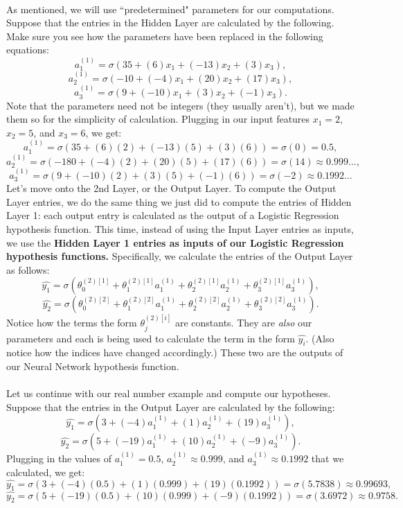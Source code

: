 \documentclass{article}
\begin{document}
\\
As mentioned, we will use ``predetermined" parameters for our computations. Suppose that the entries in the Hidden Layer are calculated by the following. Make sure you see how the parameters have been replaced in the following equations:
\[a_1^{(1)}=\sigma(35+(6)x_1+(-13)x_2+(3)x_3),\]
\[a_2^{(1)}=\sigma(-10+(-4)x_1+(20)x_2+(17)x_3),\]
\[a_3^{(1)}=\sigma(9+(-10)x_1+(3)x_2+(-1)x_3).\]
Note that the parameters need not be integers (they usually aren't), but we made them so for the simplicity of calculation. Plugging in our input features $x_1=2$, $x_2=5$, and $x_3=6$, we get:
\[a_1^{(1)}=\sigma(35+(6)(2)+(-13)(5)+(3)(6))=\sigma(0)=0.5,\]
\[a_2^{(1)}=\sigma(-180+(-4)(2)+(20)(5)+(17)(6))=\sigma(14)\approx0.999\ldots,\]
\[a_3^{(1)}=\sigma(9+(-10)(2)+(3)(5)+(-1)(6))=\sigma(-2)\approx0.1992\ldots\]
Let's move onto the 2nd Layer, or the Output Layer. To compute the Output Layer entries, we do the same thing we just did to compute the entries of Hidden Layer 1: each output entry is calculated as the output of a Logistic Regression hypothesis function. This time, instead of using the Input Layer entries as inputs, we use the \textbf{Hidden Layer 1 entries as inputs of our Logistic Regression hypothesis functions.} Specifically, we calculate the entries of the Output Layer as follows: 
\[\hat{y_1}=\sigma(\theta_0^{(2)[1]}+\theta_1^{(2)[1]}a^{(1)}_1+\theta_2^{(2)[1]}a^{(1)}_2+\theta_3^{(2)[1]}a^{(1)}_3),\]
\[\hat{y_2}=\sigma(\theta_0^{(2)[2]}+\theta_1^{(2)[2]}a^{(1)}_1+\theta_2^{(2)[2]}a^{(1)}_2+\theta_3^{(2)[2]}a^{(1)}_3).\]
Notice how the terms the form $\theta_j^{(2)[i]}$ are constants. They are \textit{also} our parameters and each is being used to calculate the term in the form $\hat{y_i}$. (Also notice how the indices have changed accordingly.) These two are the outputs of our Neural Network hypothesis function.
\\
\\
Let us continue with our real number example and compute our hypotheses. Suppose that the entries in the Output Layer are calculated by the following:
\[\hat{y_1}=\sigma(3+(-4)a^{(1)}_1+(1)a^{(1)}_2+(19)a^{(1)}_3),\]
\[\hat{y_2}=\sigma(5+(-19)a^{(1)}_1+(10)a^{(1)}_2+(-9)a^{(1)}_3).\]
Plugging in the values of $a^{(1)}_1=0.5$, $a^{(1)}_2\approx 0.999$, and $a^{(1)}_3\approx0.1992$ that we calculated, we get:
\[\hat{y_1}=\sigma(3+(-4)(0.5)+(1)(0.999)+(19)(0.1992))=\sigma(5.7838)\approx 0.99693,\]
\[\hat{y_2}=\sigma(5+(-19)(0.5)+(10)(0.999)+(-9)(0.1992))=\sigma(3.6972)\approx 0.9758.\]
\\
\end{document}
